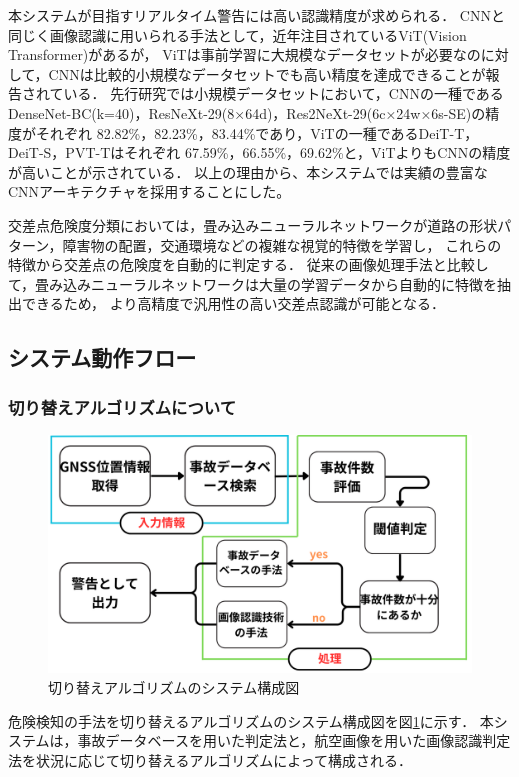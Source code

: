 \documentclass[uplatex,dvipdfmx]{jsarticle}
\begin{document}
本システムが目指すリアルタイム警告には高い認識精度が求められる．
CNNと同じく画像認識に用いられる手法として，近年注目されているViT(Vision Transformer)があるが，
ViTは事前学習に大規模なデータセットが必要なのに対して，CNNは比較的小規模なデータセットでも高い精度を達成できることが報告されている．
先行研究では小規模データセットにおいて，CNNの一種であるDenseNet-BC(k=40)，ResNeXt-29(8×64d)，Res2NeXt-29(6c×24w×6s-SE)の精度がそれぞれ
82.82\%，82.23\%，83.44\%であり，ViTの一種であるDeiT-T，DeiT-S，PVT-Tはそれぞれ
67.59\%，66.55\%，69.62\%と，ViTよりもCNNの精度が高いことが示されている\cite{ref:cnn_vit}．
以上の理由から、本システムでは実績の豊富なCNNアーキテクチャを採用することにした。

交差点危険度分類においては，畳み込みニューラルネットワークが道路の形状パターン，障害物の配置，交通環境などの複雑な視覚的特徴を学習し，
これらの特徴から交差点の危険度を自動的に判定する．
従来の画像処理手法と比較して，畳み込みニューラルネットワークは大量の学習データから自動的に特徴を抽出できるため，
より高精度で汎用性の高い交差点認識が可能となる．

\subsection{システム動作フロー}
\subsubsection{切り替えアルゴリズムについて}
\begin{figure}[H]
  \centering
  \includegraphics[width=12cm]{./Figs/system_all.png}
  \caption{切り替えアルゴリズムのシステム構成図}
  \label{fig:system_all}
\end{figure}

危険検知の手法を切り替えるアルゴリズムのシステム構成図を図\ref{fig:system_all}に示す．
本システムは，事故データベースを用いた判定法と，航空画像を用いた画像認識判定法を状況に応じて切り替えるアルゴリズムによって構成される．
\end{document}
